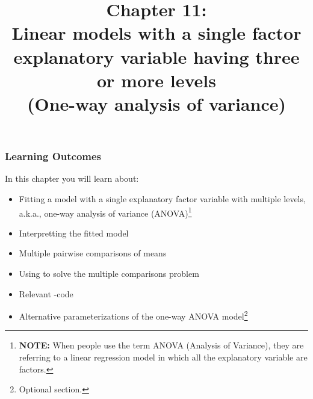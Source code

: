 \documentclass{beamer}\usepackage[]{graphicx}\usepackage[]{xcolor}
\begin{document}
\newcommand{\thechapter}{11}



\title{Chapter \thechapter: \\ Linear models with a single factor explanatory variable having three or more levels \\ (One-way analysis of variance)}



\begin{frame}
\titlepage
\end{frame}


\begin{frame}[t]
\frametitle{Learning Outcomes}
In this chapter you will learn about:
\begin{center}
\vspace{16pt}
  \begin{itemize}
  \item Fitting a model with a single explanatory factor variable with multiple levels, a.k.a., one-way analysis of variance (ANOVA)\footnote{{\bf NOTE:} When people use the term ANOVA (Analysis of Variance),
they are referring to a linear regression model in which all the explanatory variable are factors.}
  \item Interpretting the fitted model
  \item Multiple pairwise comparisons of means
  \item Using  to solve the multiple comparisons problem 
  \item Relevant -code
  \item Alternative parameterizations of the one-way ANOVA model\footnote{Optional section.}
  \end{itemize}
\end{center}

\end{frame}





\end{document}
